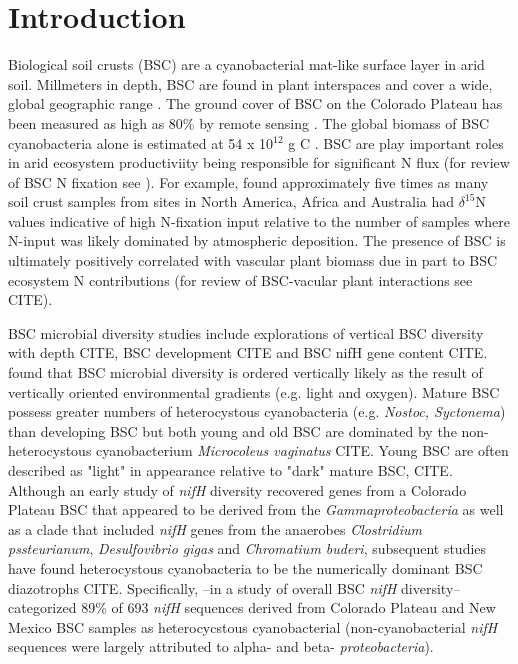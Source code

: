\section{Introduction}


Biological soil crusts (BSC) are a cyanobacterial mat-like surface layer in arid soil. Millmeters in depth, BSC are found in plant interspaces and cover a wide, global geographic range \cite{garcia2003estimates}. The ground cover of BSC on the Colorado Plateau has been measured as high as 80\% by remote sensing \cite{karnieli2001}. The global biomass of BSC cyanobacteria alone is estimated at 54 x 10$^{12}$ g C \cite{garcia2003estimates}. BSC are play important roles in arid ecosystem productiviity being responsible for significant N flux (for review of BSC N fixation see \citet{belnap2003}). For example, \citet{Evans_1999} found approximately five times as many soil crust samples from sites in North America, Africa and Australia had $\delta^{15}$N values indicative of high N-fixation input relative to the number of samples where N-input was likely dominated by atmospheric deposition. The presence of BSC is ultimately positively correlated with vascular plant biomass due in part to BSC ecosystem N contributions (for review of BSC-vacular plant interactions see CITE).

BSC microbial diversity studies include explorations of vertical BSC diversity with depth CITE, BSC development CITE and BSC nifH gene content CITE. \citet{Garcia_Pichel_2003} found that BSC microbial diversity is ordered vertically likely as the result of vertically oriented environmental gradients (e.g. light and oxygen). Mature BSC possess greater numbers of heterocystous cyanobacteria (e.g. \textit{Nostoc, Syctonema}) than developing BSC but both young and old BSC are dominated by the non-heterocystous cyanobacterium \textit{Microcoleus vaginatus} CITE. Young BSC are often described as "light" in appearance relative to "dark" mature BSC, CITE.  Although an early study of \textit{nifH} diversity recovered genes from a Colorado Plateau BSC that appeared to be derived from the \textit{Gammaproteobacteria} as well as a clade that included \textit{nifH} genes from the anaerobes \textit{Clostridium pssteurianum}, \textit{Desulfovibrio gigas} and \textit{Chromatium buderi}, subsequent studies have found heterocystous cyanobacteria to be the numerically dominant BSC diazotrophs CITE. Specifically, \citet{Yeager}--in a study of overall BSC \textit{nifH} diversity--categorized 89\% of 693 \textit{nifH} sequences derived from Colorado Plateau and New Mexico BSC samples as heterocycstous cyanobacterial (non-cyanobacterial \textit{nifH} sequences were largely attributed to alpha- and beta- \textit{proteobacteria}).

